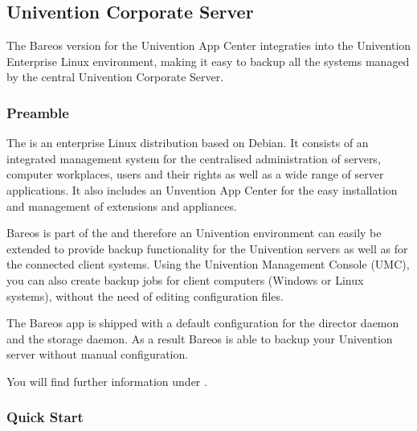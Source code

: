 \subsection{Univention Corporate Server}
\label{sec:UniventionCorporateServer}
The Bareos version for the Univention App Center integraties into the Univention Enterprise Linux environment, making it easy to backup all the systems managed by the central Univention Corporate Server.

\subsubsection{Preamble}

The  is an enterprise Linux distribution based on Debian. It consists of an integrated management system for the centralised administration of servers, computer workplaces, users and their rights as well as a wide range of server applications. It also includes an Unvention App Center
for the easy installation and management of extensions and appliances.

Bareos is part of the 
and therefore an Univention environment can easily be extended to provide backup functionality for the Univention servers as well as for the connected client systems. Using the Univention Management Console (UMC), you can also create backup jobs for client computers (Windows or Linux systems), without the need of editing configuration files.

The Bareos app is shipped with a default configuration for the director daemon and the storage daemon. As a result Bareos is able to backup your Univention server without manual configuration.


You will find further information under .

\subsubsection{Quick Start}

